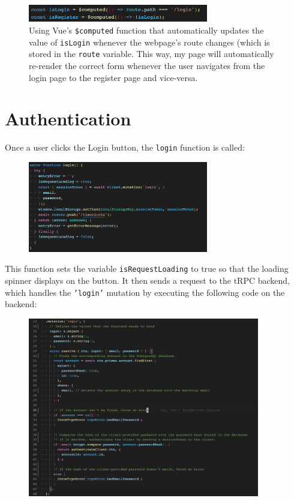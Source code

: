 \documentclass[notitlepage, 12pt]{report}
\newcommand{\code}[1]{\texttt{#1}}
\begin{document}
\begin{figure}[H]
	\centering
	\caption{Using Vue's \code{\$computed} function that automatically updates the value of \code{isLogin} whenever the webpage's route changes (which is stored in the \code{route} variable. This way, my page will automatically re-render the correct form whenever the user navigates from the login page to the register page and vice-versa.}
	\includegraphics[width=0.7\textwidth]{frontend-entry-page-route.png}
\end{figure}

\newpage

\section*{Authentication}

Once a user clicks the Login button, the \code{login} function is called:

\begin{figure}[H]
	\centering
	\includegraphics[width=0.7\textwidth]{frontend-login-function.png}
\end{figure}

This function sets the variable \code{isRequestLoading} to true so that the loading spinner displays on the button. It then sends a request to the tRPC backend, which handles the \code{'login'} mutation by executing the following code on the backend:

\begin{figure}[H]
	\centering
	\includegraphics[width=0.9\textwidth]{backend-login-function.png}
\end{figure}
\end{document}
